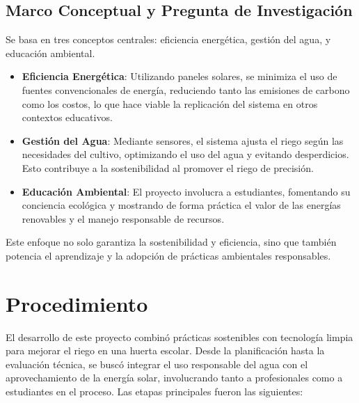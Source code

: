 \documentclass[12pt]{article}
\begin{document}
\subsection*{Marco Conceptual y Pregunta de Investigación}
Se basa en tres conceptos centrales: eficiencia energética, gestión del agua, y educación ambiental.
\begin{itemize}
      \item \textbf{Eficiencia Energética}: Utilizando paneles solares, se minimiza el uso de fuentes convencionales de energía, reduciendo tanto las emisiones de carbono como los costos, lo que hace viable la replicación del sistema en otros contextos educativos.
      \item \textbf{Gestión del Agua}: Mediante sensores, el sistema ajusta el riego según las necesidades del cultivo, optimizando el uso del agua y evitando desperdicios. Esto contribuye a la sostenibilidad al promover el riego de precisión.
      \item \textbf{Educación Ambiental}: El proyecto involucra a estudiantes, fomentando su conciencia ecológica y mostrando de forma práctica el valor de las energías renovables y el manejo responsable de recursos.
\end{itemize}

Este enfoque no solo garantiza la sostenibilidad y eficiencia, sino que también potencia el aprendizaje y la adopción de prácticas ambientales responsables.
\newpage
\section{Procedimiento}

El desarrollo de este proyecto combinó prácticas sostenibles con tecnología limpia para mejorar el riego en una huerta escolar. Desde la planificación hasta la evaluación técnica, se buscó integrar el uso responsable del agua con el aprovechamiento de la energía solar, involucrando tanto a profesionales como a estudiantes en el proceso. Las etapas principales fueron las siguientes:
\end{document}
